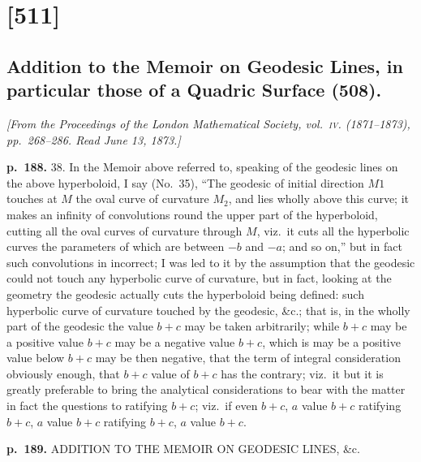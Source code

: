 \documentclass[11pt,a4paper]{article}
\begin{document}
\section{[511]}
\subsection{Addition to the Memoir on Geodesic Lines, in particular those of a Quadric Surface (508).}

\begin{center}
\textit{[From the Proceedings of the London Mathematical Society, vol.\ \textsc{iv}. (1871--1873),
pp.\ 268--286.  Read June 13, 1873.]}
\end{center}

\noindent
\textbf{p.~188.}  \textsc{38.}  In the Memoir above referred to, speaking of the geodesic lines on the above hyperboloid, I say (No.\ 35), ``The geodesic of initial direction $M1$ touches at $M$ the oval curve of curvature $M_2$, and lies wholly above this curve; it makes an infinity of convolutions round the upper part of the hyperboloid, cutting all the oval curves of curvature through $M$, viz.\ it cuts all the hyperbolic curves the parameters of which are between $-b$ and $-a$; and so on,'' but in fact such convolutions in incorrect; I was led to it by the assumption that the geodesic could not touch any hyperbolic curve of curvature, but in fact, looking at the geometry the geodesic actually cuts the hyperboloid being defined: such hyperbolic curve of curvature touched by the geodesic, \&c.;
that is, in the wholly part of the geodesic the value $b + c$ may be taken arbitrarily; while $b + c$ may be a positive value $b + c$ may be a negative value $b + c$, which is may be a positive value below $b + c$ may be then negative, that the term of integral consideration obviously enough, that $b + c$ value of $b + c$ has the contrary; viz.\ it but it is greatly preferable to bring the analytical considerations to bear with the matter in fact the questions to ratifying $b + c$; viz.\ if even $b + c$, $a$ value $b + c$ ratifying $b + c$, $a$ value $b + c$ ratifying $b + c$, $a$ value $b + c$.

\clearpage

\noindent
\textbf{p.~189.}  ADDITION TO THE MEMOIR ON GEODESIC LINES, \&c.
\end{document}
